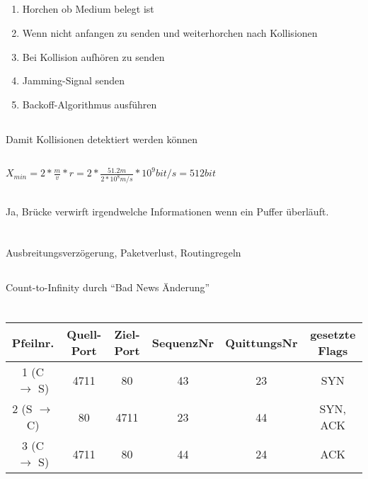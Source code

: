 \documentclass[a4paper]{article}
\begin{document}
\subsection{}
\begin{enumerate}
\item Horchen ob Medium belegt ist
\item Wenn nicht anfangen zu senden und weiterhorchen nach Kollisionen
\item Bei Kollision aufhören zu senden
\item Jamming-Signal senden
\item Backoff-Algorithmus ausführen
\end{enumerate}
\subsection{}
Damit Kollisionen detektiert werden können
\subsection{}
$X_{min} = 2 * \frac{m}{v} * r = 2 * \frac{51.2m}{2*10^8 m/s} * 10^9 bit/s = 512 bit$
\subsection{}
Ja, Brücke verwirft irgendwelche Informationen wenn ein Puffer überläuft.
\pagebreak
\section{}
\subsection{}
Ausbreitungsverzögerung, Paketverlust, Routingregeln
\subsection{}
\subsection{}
Count-to-Infinity durch ``Bad News Änderung''
\pagebreak
\section{}
\subsection{}
\begin{tabular}{|c|c|c|c|c|c|}\hline
Pfeilnr. & Quell-Port & Ziel-Port & SequenzNr & QuittungsNr & gesetzte Flags \\ \hline
1 (C $\rightarrow$ S)&4711&80&43&23&SYN\\ \hline
2 (S $\rightarrow$ C)&80&4711&23&44&SYN, ACK\\ \hline
3 (C $\rightarrow$ S)&4711&80&44&24&ACK\\ \hline
\end{tabular}
\end{document}
